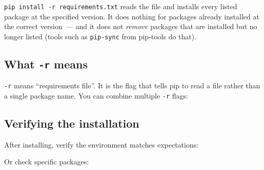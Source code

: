 \noindent{}\texttt{pip\ install\ -}\allowbreak{}\texttt{r\ requirements.}\allowbreak{}\texttt{txt} reads the file and installs every listed package at the specified version. It does nothing for packages already installed at the correct version~--- and it does not \emph{remove} packages that are installed but no longer listed (tools such as \texttt{pip-sync} from pip-tools do that).

\subsection*{\texorpdfstring{What \texttt{-r} means}{What -r means}}\label{12-dependency-declaration:what--r-means}

\texttt{-r} means ``requirements file''. It is the flag that tells pip to read a file rather than a single package name. You can combine multiple \texttt{-r} flags:

\begin{codebox}[short]

\begin{Shaded}
\begin{Highlighting}[]
\end{Highlighting}
\end{Shaded}

\end{codebox}

\subsection*{Verifying the installation}\label{12-dependency-declaration:verifying-the-installation}

After installing, verify the environment matches expectations:

\begin{codebox}[short]

\begin{Shaded}
\begin{Highlighting}[]
\end{Highlighting}
\end{Shaded}

\end{codebox}

\noindent{}Or check specific packages:

